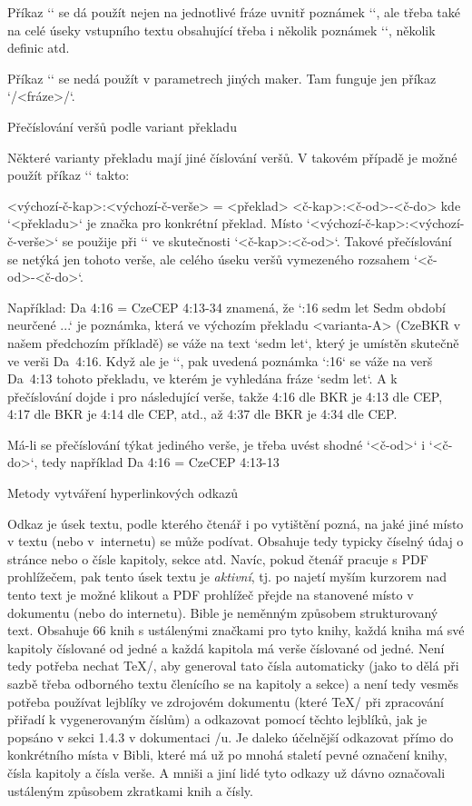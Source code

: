 Příkaz `\switch` se dá použít nejen na jednotlivé fráze uvnitř poznámek
`\Note`, ale třeba také na celé úseky vstupního textu obsahující třeba i
několik poznámek `\Note`, několik definic atd.

Příkaz `\switch` se nedá použít v parametrech jiných maker. Tam funguje jen
příkaz `\x/<fráze>/`.

\secc Přečíslování veršů podle variant překladu

\mnote{\code{\\renum}}
Některé varianty překladu mají jiné číslování veršů. V takovém případě je
možné použít příkaz `\renum` takto:

\begtt
{} <výchozí-č-kap>:<výchozí-č-verše> = <překlad> <č-kap>:<č-od>-<č-do>
\endtt
kde `<překladu>` je značka pro konkrétní překlad.
Místo `<výchozí-č-kap>:<výchozí-č-verše>` se použije při `\def\tmark{<překlad>}`
ve skutečnosti `<č-kap>:<č-od>`.
Takové přečíslování se netýká jen
tohoto verše, ale celého úseku veršů vymezeného rozsahem `<č-od>-<č-do>`.

Například:
\begtt
\renum Da 4:16 = CzeCEP 4:13-34
\endtt
znamená, že `:16 {sedm let} Sedm období neurčené ...` je poznámka,
která ve výchozím překladu <varianta-A> (CzeBKR v našem předchozím příkladě)
se váže na text `sedm let`, který je umístěn skutečně ve verši Da~4:16.
Když ale je `\def\tmark{CzeCEP}`, pak uvedená poznámka `:16`
se váže na verš Da~4:13 tohoto překladu, ve kterém je vyhledána fráze
`sedm let`. A k přečíslování dojde i pro následující verše, takže
4:16 dle BKR je 4:13 dle CEP, 4:17 dle BKR je 4:14 dle CEP, atd., až
4:37 dle BKR je 4:34 dle CEP.

Má-li se přečíslování týkat jediného verše, je třeba uvést shodné
`<č-od>` i `<č-do>`, tedy například
\begtt
\renum Da 4:16 = CzeCEP 4:13-13
\endtt

\sec[odkazy] Metody vytváření hyperlinkových odkazů

Odkaz je úsek textu, podle kterého čtenář i po vytištění pozná, na jaké jiné místo
v textu (nebo v~internetu) se může podívat. Obsahuje tedy typicky číselný údaj o
stránce nebo o čísle kapitoly, sekce atd. Navíc, pokud čtenář pracuje s PDF
prohlížečem, pak tento úsek textu je {\em aktivní}, tj. po najetí myším
kurzorem nad tento text je možné klikout a PDF prohlížeč přejde na stanovené
místo v dokumentu (nebo do internetu). Bible je neměnným způsobem
strukturovaný text. Obsahuje 66 knih s ustálenými značkami pro tyto knihy,
každá kniha má své kapitoly číslované od jedné a každá kapitola má verše
číslované od jedné. Není tedy potřeba nechat \TeX/, aby generoval tato čísla
automaticky (jako to dělá při sazbě třeba odborného textu členícího se na
kapitoly a sekce) a není tedy vesměs potřeba používat lejblíky ve zdrojovém
dokumentu (které \TeX/ při zpracování přiřadí k vygenerovaným číslům) a odkazovat pomocí
těchto lejblíků, jak je popsáno v sekci 1.4.3 v dokumentaci \OpTeX/u. Je
daleko účelnější odkazovat přímo do konkrétního místa v Bibli, které má už
po mnohá staletí pevné označení knihy, čísla kapitoly a čísla verše.
A mniši a jiní lidé tyto odkazy už dávno označovali ustáleným
způsobem zkratkami knih a čísly.

